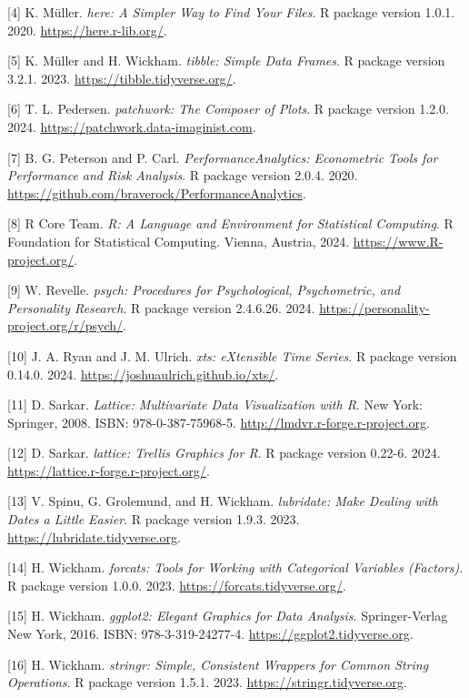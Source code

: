 \documentclass[
  letterpaper,
  DIV=11,
  numbers=noendperiod]{scrreprt}
\begin{document}
{[}4{]} K. Müller. \emph{here: A Simpler Way to Find Your Files}. R
package version 1.0.1. 2020. \url{https://here.r-lib.org/}.

{[}5{]} K. Müller and H. Wickham. \emph{tibble: Simple Data Frames}. R
package version 3.2.1. 2023. \url{https://tibble.tidyverse.org/}.

{[}6{]} T. L. Pedersen. \emph{patchwork: The Composer of Plots}. R
package version 1.2.0. 2024. \url{https://patchwork.data-imaginist.com}.

{[}7{]} B. G. Peterson and P. Carl. \emph{PerformanceAnalytics:
Econometric Tools for Performance and Risk Analysis}. R package version
2.0.4. 2020. \url{https://github.com/braverock/PerformanceAnalytics}.

{[}8{]} R Core Team. \emph{R: A Language and Environment for Statistical
Computing}. R Foundation for Statistical Computing. Vienna, Austria,
2024. \url{https://www.R-project.org/}.

{[}9{]} W. Revelle. \emph{psych: Procedures for Psychological,
Psychometric, and Personality Research}. R package version 2.4.6.26.
2024. \url{https://personality-project.org/r/psych/}.

{[}10{]} J. A. Ryan and J. M. Ulrich. \emph{xts: eXtensible Time
Series}. R package version 0.14.0. 2024.
\url{https://joshuaulrich.github.io/xts/}.

{[}11{]} D. Sarkar. \emph{Lattice: Multivariate Data Visualization with
R}. New York: Springer, 2008. ISBN: 978-0-387-75968-5.
\url{http://lmdvr.r-forge.r-project.org}.

{[}12{]} D. Sarkar. \emph{lattice: Trellis Graphics for R}. R package
version 0.22-6. 2024. \url{https://lattice.r-forge.r-project.org/}.

{[}13{]} V. Spinu, G. Grolemund, and H. Wickham. \emph{lubridate: Make
Dealing with Dates a Little Easier}. R package version 1.9.3. 2023.
\url{https://lubridate.tidyverse.org}.

{[}14{]} H. Wickham. \emph{forcats: Tools for Working with Categorical
Variables (Factors)}. R package version 1.0.0. 2023.
\url{https://forcats.tidyverse.org/}.

{[}15{]} H. Wickham. \emph{ggplot2: Elegant Graphics for Data Analysis}.
Springer-Verlag New York, 2016. ISBN: 978-3-319-24277-4.
\url{https://ggplot2.tidyverse.org}.

{[}16{]} H. Wickham. \emph{stringr: Simple, Consistent Wrappers for
Common String Operations}. R package version 1.5.1. 2023.
\url{https://stringr.tidyverse.org}.
\end{document}
